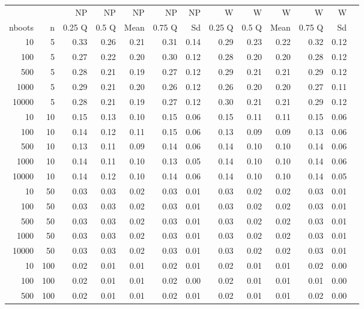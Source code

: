 \begin{table}[ht]
\footnotesize
\centering
\begin{tabular}{rrrrrrrrrrrrr}
  \hline
  & & NP & NP & NP & NP & NP & W & W & W & W & W \\
nboots & n & 0.25 Q & 0.5 Q & Mean & 0.75 Q & Sd & 0.25 Q & 0.5 Q & Mean & 0.75 Q & Sd \\ 
  \hline
10 & 5 & 0.33 & 0.26 & 0.21 & 0.31 & 0.14 & 0.29 & 0.23 & 0.22 & 0.32 & 0.12 \\ 
  100 & 5 & 0.27 & 0.22 & 0.20 & 0.30 & 0.12 & 0.28 & 0.20 & 0.20 & 0.28 & 0.12 \\ 
  500 & 5 & 0.28 & 0.21 & 0.19 & 0.27 & 0.12 & 0.29 & 0.21 & 0.21 & 0.29 & 0.12 \\ 
  1000 & 5 & 0.29 & 0.21 & 0.20 & 0.26 & 0.12 & 0.26 & 0.20 & 0.20 & 0.27 & 0.11 \\ 
  10000 & 5 & 0.28 & 0.21 & 0.19 & 0.27 & 0.12 & 0.30 & 0.21 & 0.21 & 0.29 & 0.12 \\ 
  10 & 10 & 0.15 & 0.13 & 0.10 & 0.15 & 0.06 & 0.15 & 0.11 & 0.11 & 0.15 & 0.06 \\ 
  100 & 10 & 0.14 & 0.12 & 0.11 & 0.15 & 0.06 & 0.13 & 0.09 & 0.09 & 0.13 & 0.06 \\ 
  500 & 10 & 0.13 & 0.11 & 0.09 & 0.14 & 0.06 & 0.14 & 0.10 & 0.10 & 0.14 & 0.06 \\ 
  1000 & 10 & 0.14 & 0.11 & 0.10 & 0.13 & 0.05 & 0.14 & 0.10 & 0.10 & 0.14 & 0.06 \\ 
  10000 & 10 & 0.14 & 0.12 & 0.10 & 0.14 & 0.06 & 0.14 & 0.10 & 0.10 & 0.14 & 0.05 \\ 
  10 & 50 & 0.03 & 0.03 & 0.02 & 0.03 & 0.01 & 0.03 & 0.02 & 0.02 & 0.03 & 0.01 \\ 
  100 & 50 & 0.03 & 0.03 & 0.02 & 0.03 & 0.01 & 0.03 & 0.02 & 0.02 & 0.03 & 0.01 \\ 
  500 & 50 & 0.03 & 0.03 & 0.02 & 0.03 & 0.01 & 0.03 & 0.02 & 0.02 & 0.03 & 0.01 \\ 
  1000 & 50 & 0.03 & 0.03 & 0.02 & 0.03 & 0.01 & 0.03 & 0.02 & 0.02 & 0.03 & 0.01 \\ 
  10000 & 50 & 0.03 & 0.03 & 0.02 & 0.03 & 0.01 & 0.03 & 0.02 & 0.02 & 0.03 & 0.01 \\ 
  10 & 100 & 0.02 & 0.01 & 0.01 & 0.02 & 0.01 & 0.02 & 0.01 & 0.01 & 0.02 & 0.00 \\ 
  100 & 100 & 0.02 & 0.01 & 0.01 & 0.02 & 0.00 & 0.02 & 0.01 & 0.01 & 0.01 & 0.00 \\ 
  500 & 100 & 0.02 & 0.01 & 0.01 & 0.02 & 0.01 & 0.02 & 0.01 & 0.01 & 0.02 & 0.00 \\ 

\end{tabular}
\end{table}
